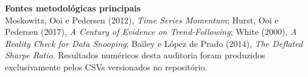 \documentclass[10pt,a4paper]{article}
\begin{document}
\vfill
{\small\color{navy}\textbf{Fontes metodológicas principais}}\\
{\footnotesize Moskowitz, Ooi e Pedersen (2012), \textit{Time Series Momentum};
Hurst, Ooi e Pedersen (2017), \textit{A Century of Evidence on Trend-Following};
White (2000), \textit{A Reality Check for Data Snooping}; Bailey e López de Prado
(2014), \textit{The Deflated Sharpe Ratio}. Resultados numéricos desta auditoria
foram produzidos exclusivamente pelos CSVs versionados no repositório.}
\end{document}
